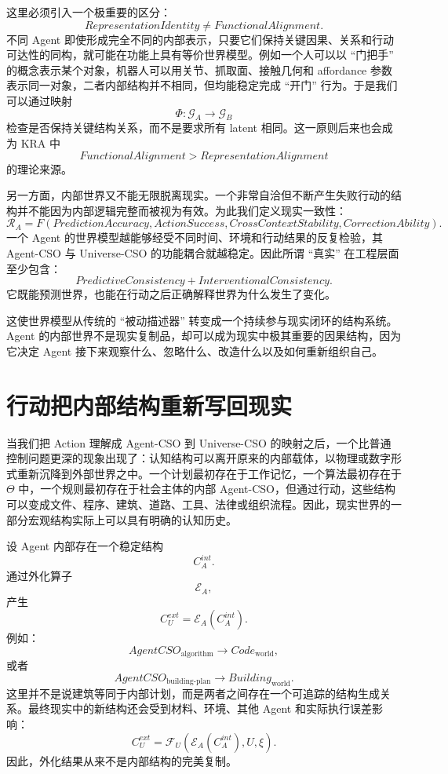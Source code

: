 这里必须引入一个极重要的区分：
\[
\boxed{
RepresentationIdentity
\neq
FunctionalAlignment.
}
\]
不同 Agent 即使形成完全不同的内部表示，只要它们保持关键因果、关系和行动可达性的同构，就可能在功能上具有等价世界模型。例如一个人可以以 ``门把手'' 的概念表示某个对象，机器人可以用关节、抓取面、接触几何和 affordance 参数表示同一对象，二者内部结构并不相同，但均能稳定完成 ``开门'' 行为。于是我们可以通过映射
\[
\Phi:
\mathcal G_A
\rightarrow
\mathcal G_B
\]
检查是否保持关键结构关系，而不是要求所有 latent 相同。这一原则后来也会成为 KRA 中
\[
FunctionalAlignment
>
RepresentationAlignment
\]
的理论来源。

另一方面，内部世界又不能无限脱离现实。一个非常自洽但不断产生失败行动的结构并不能因为内部逻辑完整而被视为有效。为此我们定义现实一致性：
\[
\mathcal R_A
=
F
\left(
PredictionAccuracy,
ActionSuccess,
CrossContextStability,
CorrectionAbility
\right).
\]
一个 Agent 的世界模型越能够经受不同时间、环境和行动结果的反复检验，其 Agent-CSO 与 Universe-CSO 的功能耦合就越稳定。因此所谓 ``真实'' 在工程层面至少包含：
\[
\boxed{
PredictiveConsistency
+
InterventionalConsistency.
}
\]
它既能预测世界，也能在行动之后正确解释世界为什么发生了变化。

这使世界模型从传统的 ``被动描述器'' 转变成一个持续参与现实闭环的结构系统。Agent 的内部世界不是现实复制品，却可以成为现实中极其重要的因果结构，因为它决定 Agent 接下来观察什么、忽略什么、改造什么以及如何重新组织自己。


\section{行动把内部结构重新写回现实}

当我们把 Action 理解成 Agent-CSO 到 Universe-CSO 的映射之后，一个比普通控制问题更深的现象出现了：认知结构可以离开原来的内部载体，以物理或数字形式重新沉降到外部世界之中。一个计划最初存在于工作记忆，一个算法最初存在于 $\Theta$ 中，一个规则最初存在于社会主体的内部 Agent-CSO，但通过行动，这些结构可以变成文件、程序、建筑、道路、工具、法律或组织流程。因此，现实世界的一部分宏观结构实际上可以具有明确的认知历史。

设 Agent 内部存在一个稳定结构
\[
C_A^{int}.
\]
通过外化算子
\[
\mathcal E_A,
\]
产生
\[
C_U^{ext}
=
\mathcal E_A(C_A^{int}).
\]
例如：
\[
AgentCSO_{\text{algorithm}}
\rightarrow
Code_{\text{world}},
\]
或者
\[
AgentCSO_{\text{building-plan}}
\rightarrow
Building_{\text{world}}.
\]
这里并不是说建筑等同于内部计划，而是两者之间存在一个可追踪的结构生成关系。最终现实中的新结构还会受到材料、环境、其他 Agent 和实际执行误差影响：
\[
C_U^{ext}
=
\mathcal F_U
\left(
\mathcal E_A(C_A^{int}),
U,
\xi
\right).
\]
因此，外化结果从来不是内部结构的完美复制。

